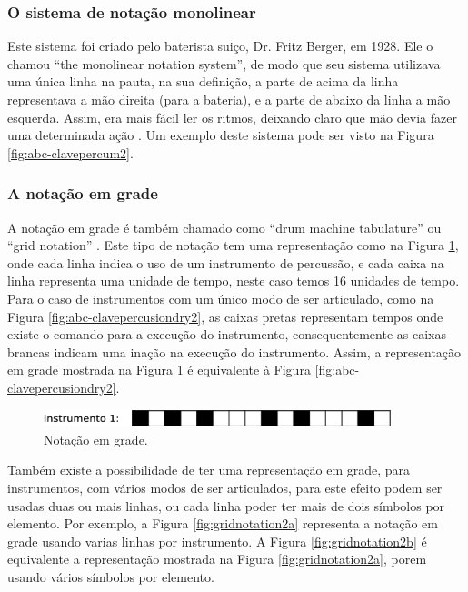 \subsubsection{O sistema de notação monolinear}
Este sistema foi criado pelo baterista suiço, Dr. Fritz Berger, em 1928. 
Ele o chamou ``the monolinear notation system'', 
de modo que seu sistema utilizava uma única linha na pauta, na sua definição,
a parte de acima da linha representava a mão direita (para a bateria), e
a parte de abaixo da linha a mão esquerda.
Assim, era mais fácil ler os ritmos, deixando claro que mão devia fazer uma determinada ação
\cite[pp. 148]{beck1995encyclopedia} \cite[pp. 332]{dean2012drum}.
Um exemplo deste sistema pode ser visto na Figura \ref{fig:abc-clavepercum2}.

\subsubsection{A notação em grade}
A notação em grade é também chamado como ``drum machine tabulature'' \cite{badness1991drum} ou
``grid notation'' \cite{bardet1985200}. Este tipo de notação tem uma representação como na Figura \ref{fig:gridnotation1},
onde cada linha indica o uso de um instrumento de percussão, 
e cada caixa na linha representa uma unidade de tempo, neste caso temos 16 unidades de tempo.
Para o caso de instrumentos com um único modo de ser articulado, como na Figura \ref{fig:abc-clavepercusiondry2},
as caixas pretas representam tempos onde existe o comando para a execução do instrumento,
consequentemente as caixas brancas indicam uma inação na execução do instrumento.
Assim, a representação em grade mostrada na Figura \ref{fig:gridnotation1} 
é equivalente à Figura \ref{fig:abc-clavepercusiondry2}.
\begin{figure}[h]
    \centering 
\includegraphics[width=0.9\textwidth]{chapters/cap-musica-basica/gridnotation.eps}
    \caption{Notação em grade.}\label{fig:gridnotation1}
\end{figure}

Também existe a possibilidade de ter uma representação em grade, para instrumentos, 
com vários modos de ser articulados, para este efeito podem ser usadas duas ou mais linhas,
ou cada linha poder ter mais de dois símbolos por elemento.
Por exemplo, a Figura \ref{fig:gridnotation2a} representa a notação em grade usando
varias linhas por instrumento. A Figura \ref{fig:gridnotation2b} é equivalente 
a representação mostrada na Figura \ref{fig:gridnotation2a}, porem usando vários símbolos por elemento.

